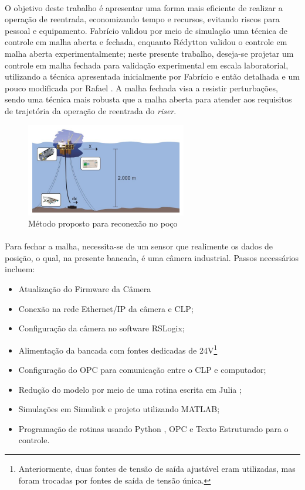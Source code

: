 \paragraph{} O objetivo deste trabalho é apresentar uma forma mais eficiente de realizar a operação de reentrada, economizando tempo e recursos, evitando riscos para pessoal e equipamento. Fabrício \cite{fabricioIFAC} validou por meio de simulação uma técnica de controle em malha aberta e fechada, enquanto Rédytton \cite{redytton} validou o controle em malha aberta experimentalmente; neste presente trabalho, deseja-se projetar um controle em malha fechada para validação experimental em escala laboratorial, utilizando a técnica apresentada inicialmente por Fabrício \cite{fabricioIFAC} e então detalhada e um pouco modificada por Rafael \cite{rafaelMestrado}. A malha fechada visa a resistir perturbações, sendo uma técnica mais robusta que a malha aberta para atender aos requisitos de trajetória da operação de reentrada do \textit{riser}.

\begin{figure}[ht!]
\centering
  \includegraphics[width=7cm]{figs/introducao/posicionamentoProposto}
  \caption{Método proposto para reconexão no poço \cite{redytton} \label{posicionamentoProposto}}
\end{figure}

\paragraph{} Para fechar a malha, necessita-se de um sensor que realimente os dados de posição, o qual, na presente bancada, é uma câmera industrial. Passos necessários incluem: \begin{itemize}
	\item Atualização do Firmware da Câmera
	\item Conexão na rede Ethernet/IP da câmera e CLP;
	\item Configuração da câmera no software RSLogix;
	\item Alimentação da bancada com fontes dedicadas de 24V\footnote{Anteriormente, duas fontes de tensão de saída ajustável eram utilizadas, mas foram trocadas por fontes de saída de tensão única.}
	\item Configuração do OPC para comunicação entre o CLP e computador;
	\item Redução do modelo por meio de uma rotina escrita em Julia \cite{julia};
	\item Simulações em Simulink e projeto utilizando MATLAB;
	\item Programação de rotinas usando Python \cite{python}, OPC e Texto Estruturado para o controle.
\end{itemize}

